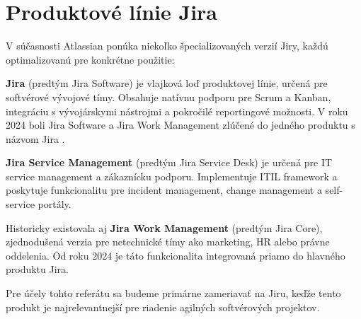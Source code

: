 \section{Produktové línie Jira}

V súčasnosti Atlassian ponúka niekoľko špecializovaných verzií Jiry, každú optimalizovanú pre konkrétne použitie:

\textbf{Jira} (predtým Jira Software) je vlajková loď produktovej línie, určená pre softvérové vývojové tímy. Obsahuje natívnu podporu pre Scrum a Kanban, integráciu s vývojárskymi nástrojmi a pokročilé reportingové možnosti. V roku 2024 boli Jira Software a Jira Work Management zlúčené do jedného produktu s názvom Jira \cite{atlassian_jira_software2024}.

\textbf{Jira Service Management} (predtým Jira Service Desk) je určená pre IT service management a zákaznícku podporu. Implementuje ITIL framework a poskytuje funkcionalitu pre incident management, change management a self-service portály.

Historicky existovala aj \textbf{Jira Work Management} (predtým Jira Core), zjednodušená verzia pre netechnické tímy ako marketing, HR alebo právne oddelenia. Od roku 2024 je táto funkcionalita integrovaná priamo do hlavného produktu Jira.

Pre účely tohto referátu sa budeme primárne zameriavať na Jiru, keďže tento produkt je najrelevantnejší pre riadenie agilných softvérových projektov.
